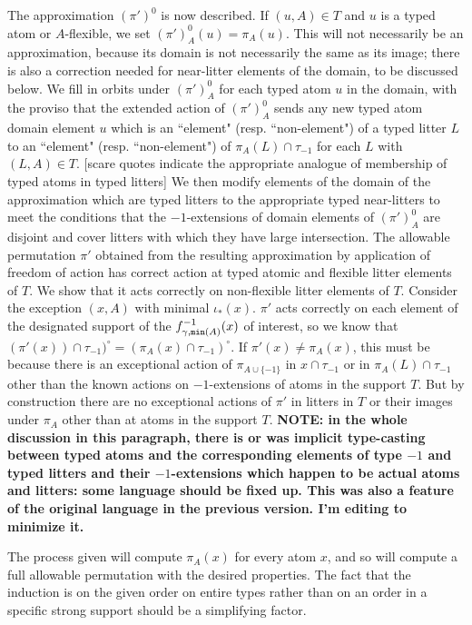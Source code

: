 \documentclass[112pt]{article}
\begin{document}
\begin{description}
The approximation $(\pi')^0$ is now described.  If $(u,A) \in T$ and $u$ is a typed atom or $A$-flexible, we set $(\pi')^0_A(u) = \pi_A(u)$.
This will not necessarily be an approximation, because its domain is not necessarily the same as its image;  there is also a correction needed for near-litter elements of the domain, to be discussed below.  We fill in orbits under $(\pi')^0_A$ for each
typed atom $u$ in the domain, with the proviso that the extended action of $(\pi')^0_A$ sends any new typed atom domain element $u$ which is an ``element" (resp. ``non-element") of a typed litter $L$ to an ``element" (resp. ``non-element") of $\pi_A(L)\cap \tau_{-1}$ for each $L$ with $(L,A) \in T$.  [scare quotes indicate the appropriate analogue of membership of typed atoms in typed litters]
We then modify elements of the domain of the approximation which are typed litters to the appropriate typed near-litters to meet the conditions
that the $-1$-extensions of domain elements of $(\pi')^0_A$ are disjoint and cover litters with which they have large intersection.  The allowable permutation $\pi'$ obtained from the resulting
approximation by application of freedom of action has correct action at typed atomic and flexible litter elements of $T$.  We show that it acts correctly on non-flexible litter elements of $T$.  Consider the exception $(x,A)$ with minimal $\iota_*(x)$.  $\pi'$ acts correctly on each element of the designated support of the $f_{\gamma,{\tt min}(A)}^{-1}(x)$ of interest, so we know that $(\pi'(x))\cap \tau_{-1})^\circ=(\pi_A(x)\cap \tau_{-1})^\circ$.  If $\pi'(x) \neq \pi_A(x)$, this must be because there is an exceptional action of $\pi_{A \cup \{-1\}}$  in $x \cap \tau_{-1}$ or in $\pi_A(L)\cap \tau_{-1}$ other than the known actions on $-1$-extensions of atoms in the support $T$.  But by construction there are no exceptional actions of $\pi'$ in litters in $T$ or their images under $\pi_A$ other than at atoms in the support $T$.  {\bf NOTE: in the whole discussion in this paragraph, there is or was implicit type-casting between typed atoms and the corresponding elements of type $-1$ and typed litters and their $-1$-extensions which happen to be actual atoms and litters:  some language should be fixed up.  This was also a feature of the original language in the previous version.  I'm editing to minimize it.}

The process given will compute $\pi_A(x)$ for every atom $x$, and so will compute a full allowable permutation with the desired properties.  The fact
that the induction is on the given order on entire types rather than on an order in a specific strong support should be a simplifying factor.

\end{description}
\end{document}
